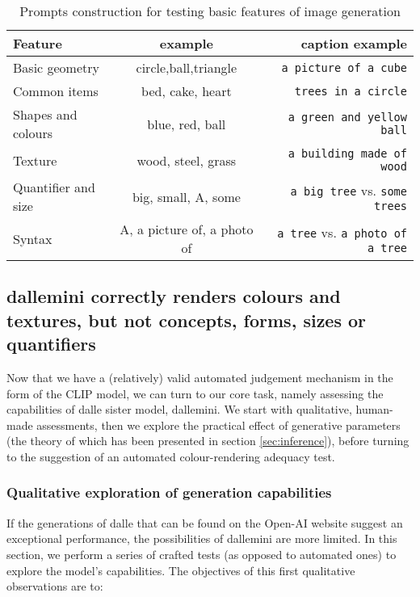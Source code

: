 \documentclass{article}
\begin{document}
\begin{multicols}{2}
\begin{table*}[]
    \centering
    \begin{tabular}{|l|c|r|}
        \hline
        Feature & example & caption example \tabularnewline
        \hline
        Basic geometry & circle,ball,triangle & \texttt{a picture of a cube} \tabularnewline \hline
        Common items & bed, cake, heart & \texttt{trees in a circle} \tabularnewline \hline
        Shapes and colours & blue, red, ball & \texttt{a green and yellow ball} \tabularnewline \hline
        Texture & wood, steel, grass & \texttt{a building made of wood}\tabularnewline \hline 
        Quantifier and size & big, small, A, some & \texttt{a big tree} vs. \texttt{some trees} \tabularnewline \hline
        Syntax & A, a picture of, a photo of & \texttt{a tree} vs. \texttt{a photo of a tree} \tabularnewline
        \hline
    \end{tabular}
    \caption{Prompts construction for testing basic features of image generation}
    \label{tab:prompts}
\end{table*}

\subsection{\gls{dallemini} correctly renders colours and textures, but not concepts, forms, sizes or quantifiers}

Now that we have a (relatively) valid automated judgement mechanism in the form of the CLIP model, we can turn to our core task, namely assessing the capabilities of \gls{dalle} sister model, \gls{dallemini}. We start with qualitative, human-made assessments, then we explore the practical effect of generative parameters (the theory of which has been presented in section \ref{sec:inference}), before turning to the suggestion of an automated colour-rendering adequacy test.

\subsubsection{Qualitative exploration of generation capabilities}\label{subsubsection:qualitativegeneration}

If the generations of \gls{dalle} that can be found on the Open-AI website suggest an exceptional performance, the possibilities of \gls{dallemini} are more limited. In this section, we perform a series of crafted tests (as opposed to automated ones) to explore the model's capabilities. The objectives of this first qualitative observations are to:


\end{multicols}
\end{document}
